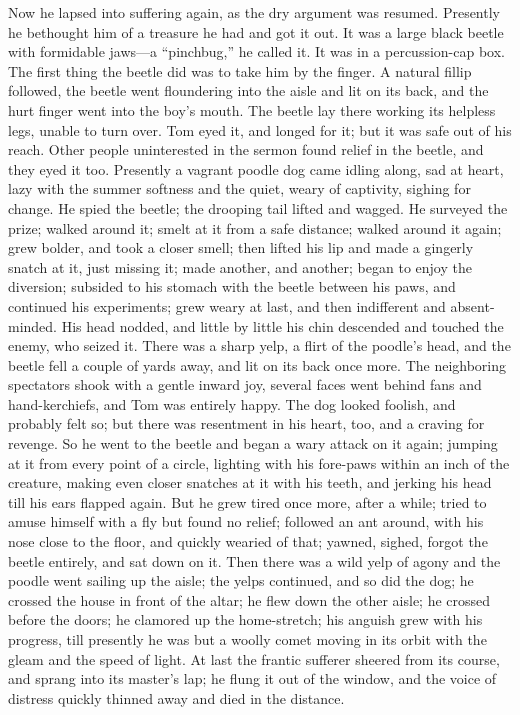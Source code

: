 \documentclass{book}
\begin{document}
Now he lapsed into suffering again, as the dry argument was resumed. Presently he bethought him of a treasure he had and got it out. It was a large black beetle with formidable jaws—a “pinchbug,” he called it. It was in a percussion-cap box. The first thing the beetle did was to take him by the finger. A natural fillip followed, the beetle went floundering into the aisle and lit on its back, and the hurt finger went into the boy’s mouth. The beetle lay there working its helpless legs, unable to turn over. Tom eyed it, and longed for it; but it was safe out of his reach. Other people uninterested in the sermon found relief in the beetle, and they eyed it too. Presently a vagrant poodle dog came idling along, sad at heart, lazy with the summer softness and the quiet, weary of captivity, sighing for change. He spied the beetle; the drooping tail lifted and wagged. He surveyed the prize; walked around it; smelt at it from a safe distance; walked around it again; grew bolder, and took a closer smell; then lifted his lip and made a gingerly snatch at it, just missing it; made another, and another; began to enjoy the diversion; subsided to his stomach with the beetle between his paws, and continued his experiments; grew weary at last, and then indifferent and absent-minded. His head nodded, and little by little his chin descended and touched the enemy, who seized it. There was a sharp yelp, a flirt of the poodle’s head, and the beetle fell a couple of yards away, and lit on its back once more. The neighboring spectators shook with a gentle inward joy, several faces went behind fans and hand-kerchiefs, and Tom was entirely happy. The dog looked foolish, and probably felt so; but there was resentment in his heart, too, and a craving for revenge. So he went to the beetle and began a wary attack on it again; jumping at it from every point of a circle, lighting with his fore-paws within an inch of the creature, making even closer snatches at it with his teeth, and jerking his head till his ears flapped again. But he grew tired once more, after a while; tried to amuse himself with a fly but found no relief; followed an ant around, with his nose close to the floor, and quickly wearied of that; yawned, sighed, forgot the beetle entirely, and sat down on it. Then there was a wild yelp of agony and the poodle went sailing up the aisle; the yelps continued, and so did the dog; he crossed the house in front of the altar; he flew down the other aisle; he crossed before the doors; he clamored up the home-stretch; his anguish grew with his progress, till presently he was but a woolly comet moving in its orbit with the gleam and the speed of light. At last the frantic sufferer sheered from its course, and sprang into its master’s lap; he flung it out of the window, and the voice of distress quickly thinned away and died in the distance.
\end{document}
